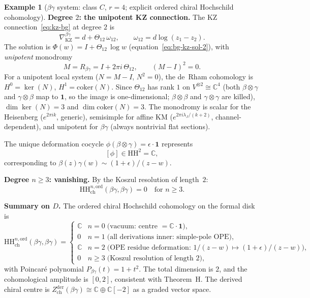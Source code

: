 \documentclass[11pt,reqno]{amsart}
\theoremstyle{definition}
\newtheorem{example}[theorem]{Example}
\theoremstyle{remark}
\newcommand{\HH}{\mathrm{HH}}
\newcommand{\CC}{\mathbb{C}}
\numberwithin{equation}{section}
\begin{document}
\begin{example}[$\beta\gamma$ system: class $C$, $r = 4$;
explicit ordered chiral Hochschild cohomology]
\medskip
\noindent
\textbf{Degree $2$: the unipotent KZ connection.}
The KZ connection~\eqref{eq:kz-bg} at degree $2$ is
\begin{equation}\label{eq:kz-bg-2}
\nabla_{\mathrm{KZ}}^{\beta\gamma}
= d + \Theta_{12}\,\omega_{12},
\qquad \omega_{12} = d\log(z_1 - z_2).
\end{equation}
The solution is $\Phi(w) = I + \Theta_{12}\,\log w$
(equation~\eqref{eq:bg-kz-sol-2}), with
\emph{unipotent} monodromy
\begin{equation}\label{eq:bg-monodromy}
M = R_{\beta\gamma} = I + 2\pi i\,\Theta_{12},
\qquad (M - I)^2 = 0.
\end{equation}
For a unipotent local system ($N = M - I$, $N^2 = 0$),
the de~Rham cohomology is $H^0 = \ker(N)$,
$H^1 = \mathrm{coker}(N)$.
Since $\Theta_{12}$ has rank $1$ on $V^{\otimes 2} \cong \CC^4$
(both $\beta \otimes \gamma$ and $\gamma \otimes \beta$
map to $\mathbf{1}$, so the image is one-dimensional;
$\beta \otimes \beta$ and $\gamma \otimes \gamma$ are killed),
$\dim \ker(N) = 3$ and $\dim \mathrm{coker}(N) = 3$.
The monodromy is scalar for the Heisenberg
($e^{2\pi ik}$, generic), semisimple for affine KM
($e^{2\pi i\lambda_J/(k+2)}$, channel-dependent), and
unipotent for $\beta\gamma$ (always nontrivial flat
sections).

The unique deformation cocycle
$\phi(\beta \otimes \gamma)
= \epsilon \cdot \mathbf{1}$ represents
\begin{equation}\label{eq:bg-hh2}
[\phi] \in \HH^2 = \CC,
\end{equation}
corresponding to $\beta(z)\gamma(w) \sim (1 + \epsilon)/(z - w)$.

\medskip
\noindent
\textbf{Degree $n \geq 3$: vanishing.}
By the Koszul resolution of length~$2$:
\begin{equation}\label{eq:bg-higher-vanish}
\HH^{n,\mathrm{ord}}_{\mathrm{ch}}(\beta\gamma, \beta\gamma) = 0
\quad \text{for } n \geq 3.
\end{equation}

\medskip
\noindent
\textbf{Summary on $D$.}
The ordered chiral Hochschild cohomology on the formal disk is
\begin{equation}\label{eq:bg-hh-summary}
\HH^{n,\mathrm{ord}}_{\mathrm{ch}}(\beta\gamma, \beta\gamma) =
\begin{cases}
\CC & n = 0 \;\text{(vacuum: centre $= \CC \cdot \mathbf{1}$)}, \\
0 & n = 1 \;\text{(all derivations inner: simple-pole OPE)}, \\
\CC & n = 2 \;\text{(OPE residue deformation:
  $1/(z{-}w) \mapsto (1{+}\epsilon)/(z{-}w)$)}, \\
0 & n \geq 3 \;\text{(Koszul resolution of length $2$)},
\end{cases}
\end{equation}
with Poincar\'e polynomial $P_{\beta\gamma}(t) = 1 + t^2$.
The total dimension is $2$, and the cohomological amplitude
is $[0, 2]$, consistent with Theorem~H.
The derived chiral centre is
$Z^{\mathrm{der}}_{\mathrm{ch}}(\beta\gamma) \cong
\CC \oplus \CC[-2]$
as a graded vector space.


\end{example}
\end{document}
